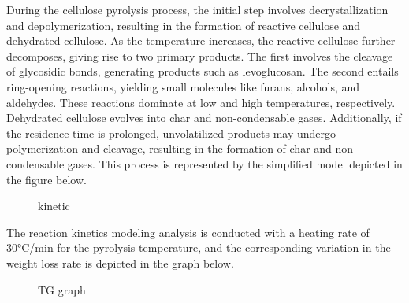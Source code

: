 \documentclass{swmcmthesis}
\begin{document}
During the cellulose pyrolysis process, the initial step involves decrystallization and depolymerization, resulting in the formation of reactive cellulose and dehydrated cellulose. As the temperature increases, the reactive cellulose further decomposes, giving rise to two primary products. The first involves the cleavage of glycosidic bonds, generating products such as levoglucosan. The second entails ring-opening reactions, yielding small molecules like furans, alcohols, and aldehydes. These reactions dominate at low and high temperatures, respectively. Dehydrated cellulose evolves into char and non-condensable gases. Additionally, if the residence time is prolonged, unvolatilized products may undergo polymerization and cleavage, resulting in the formation of char and non-condensable gases. This process is represented by the simplified model depicted in the figure below\cite{bib5}.

\begin{figure}[h!t]
    \centering
    \hfill
    \caption{kinetic}
\end{figure}

The reaction kinetics modeling analysis is conducted with a heating rate of 30°C/min for the pyrolysis temperature, and the corresponding variation in the weight loss rate is depicted in the graph below.

\begin{figure}[h!t]
    \centering
    \hfill
    \caption{TG graph}
\end{figure}
\end{document}
